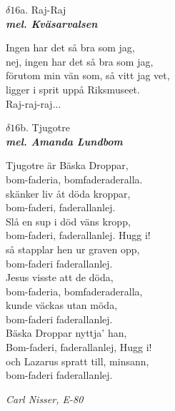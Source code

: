 \documentclass[a6paper,10pt]{article}
\newcommand{\mel}[1]{\small\textbf{\textit{mel. #1 \\}}}
\begin{document}
\setlength{\oddsidemargin}{-0.37in}
\noindent
\begin{center}
\Large $\delta16$a. Raj-Raj\\ 
\mel{Kväsarvalsen}
\end{center}
Ingen har det så bra som jag, \\
nej, ingen har det så bra som jag, \\
förutom min vän som, så vitt jag vet, \\
ligger i sprit uppå Riksmuseet. 
\vspace{5pt}\\
Raj-raj-raj... 
\vspace{20pt}
\begin{center}
\Large $\delta16$b. Tjugotre\\ 
\mel{Amanda Lundbom}
\end{center}
Tjugotre är Bäska Droppar, \\
bom-faderia, bomfaderaderalla. \\
skänker liv åt döda kroppar, \\
bom-faderi, faderallanlej. 
\vspace{5pt}\\
Slå en sup i död väns kropp, \\
bom-faderi, faderallanlej. Hugg i! \\
så stapplar hen ur graven opp, \\
bom-faderi faderallanlej. 
\vspace{5pt}\\
Jesus visste att de döda, \\
bom-faderia, bomfaderaderalla, \\
kunde väckas utan möda, \\
bom-faderi faderallanlej. 
\vspace{5pt}\\
Bäska Droppar nyttja' han, \\
Bom-faderi, faderallanlej, Hugg i! \\
och Lazarus spratt till, minsann, \\
bom-faderi faderallanlej. 
\begin{flushright}
\textit{Carl Nisser, E-80}
\end{flushright}
\end{document}
